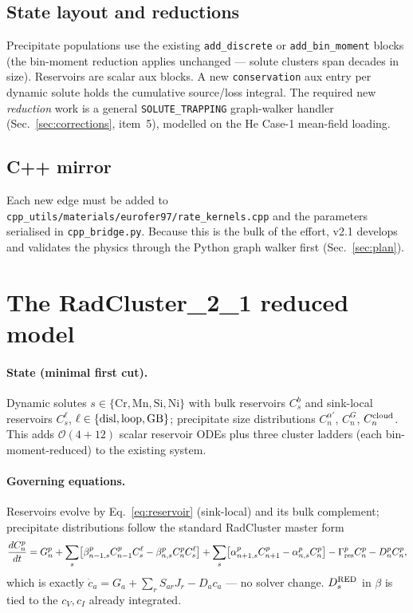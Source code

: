 \documentclass[11pt]{article}
\newcommand{\cv}{c_{V}}
\newcommand{\ci}{c_{I}}
\newcommand{\code}[1]{\texttt{#1}}
\begin{document}
\subsection{State layout and reductions}
Precipitate populations use the existing \code{add\_discrete} or
\code{add\_bin\_moment} blocks (the bin-moment reduction applies unchanged ---
solute clusters span decades in size). Reservoirs are scalar aux blocks. A new
\code{conservation} aux entry per dynamic solute holds the cumulative
source/loss integral. The required new \emph{reduction} work is a general
\code{SOLUTE\_TRAPPING} graph-walker handler (Sec.~\ref{sec:corrections},
item~5), modelled on the He Case-1 mean-field loading.

\subsection{C++ mirror}
Each new edge must be added to \code{cpp\_utils/materials/eurofer97/rate\_kernels.cpp}
and the parameters serialised in \code{cpp\_bridge.py}. Because this is the bulk
of the effort, v2.1 develops and validates the physics through the Python graph
walker first (Sec.~\ref{sec:plan}).

\section{The RadCluster\_2\_1 reduced model}
\label{sec:model}
\paragraph{State (minimal first cut).}
Dynamic solutes $s\in\{\mathrm{Cr},\mathrm{Mn},\mathrm{Si},\mathrm{Ni}\}$ with
bulk reservoirs $C_s^{b}$ and sink-local reservoirs $C_s^{\ell}$,
$\ell\in\{\rm disl,loop,GB\}$; precipitate size distributions $C_n^{\alpha'}$,
$C_n^{G}$, $C_n^{\rm cloud}$. This adds $\mathcal{O}(4{+}12)$ scalar reservoir
ODEs plus three cluster ladders (each bin-moment-reduced) to the existing
system.

\paragraph{Governing equations.}
Reservoirs evolve by Eq.~\eqref{eq:reservoir} (sink-local) and its bulk
complement; precipitate distributions follow the standard RadCluster master
form
\begin{equation}
\frac{dC_n^{p}}{dt}=G_n^{p}
 +\sum_s\!\big[\beta_{n-1,s}^{p}C_{n-1}^{p}C_s^{\ell}-\beta_{n,s}^{p}C_n^{p}C_s^{\ell}\big]
 +\sum_s\!\big[\alpha_{n+1,s}^{p}C_{n+1}^{p}-\alpha_{n,s}^{p}C_n^{p}\big]
 -\Gamma_{\rm res}^{p}C_n^{p}-D_n^{p}C_n^{p},
\end{equation}
which is exactly $\dot c_a=G_a+\sum_r S_{ar}J_r-D_a c_a$ --- no solver change.
$D_s^{\rm RED}$ in $\beta$ is tied to the $\cv,\ci$ already integrated.
\end{document}
